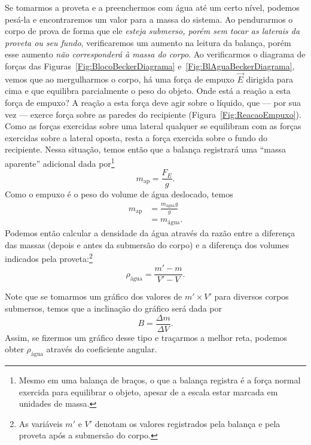 Se tomarmos a proveta e a preenchermos com água até um certo nível, podemos pesá-la e encontraremos um valor para a massa do sistema. Ao pendurarmos o corpo de prova de forma que ele \emph{esteja submerso, porém sem tocar as laterais da proveta ou seu fundo}, verificaremos um aumento na leitura da balança, porém esse aumento \emph{não corresponderá à massa do corpo}. Ao verificarmos o diagrama de forças das Figuras~\ref{Fig:BlocoBeckerDiagrama} e~\ref{Fig:BlAguaBeckerDiagrama}, vemos que ao mergulharmos o corpo, há uma força de empuxo $\vec{E}$ dirigida para cima e que equilibra parcialmente o peso do objeto. Onde está a reação a esta força de empuxo? A reação a esta força deve agir sobre o líquido, que --- por sua vez --- exerce força sobre as paredes do recipiente (Figura~\ref{Fig:ReacaoEmpuxo}). Como as forças exercidas sobre uma lateral qualquer se equilibram com as forças exercidas sobre a lateral oposta, resta a força exercida sobre o fundo do recipiente. Nessa situação, temos então que a balança registrará uma ``massa aparente'' adicional dada por\footnote{Mesmo em uma balança de braços, o que a balança registra é a força normal exercida para equilibrar o objeto, apesar de a escala estar marcada em unidades de massa.}
\begin{equation}
	m_{\textrm{ap}} = \frac{F_E}{g}.
\end{equation}
%
Como o empuxo é o peso do volume de água deslocado, temos
\begin{align}
	m_{\textrm{ap}} &= \frac{m_{\textrm{água}}g}{g} \\
	&=m_{\textrm{água}}.
\end{align}
%
Podemos então calcular a densidade da água através da razão entre a diferença das massas (depois e antes da submersão do corpo) e a diferença dos volumes indicados pela proveta:\footnote{As variáveis $m'$ e $V'$ denotam os valores registrados pela balança e pela proveta após a submersão do corpo.}
\begin{equation}
	\rho_{\textrm{água}} = \frac{m'-m}{V'-V}.
\end{equation}

Note que se tomarmos um gráfico dos valores de $m'\times V'$ para diversos corpos submersos, temos que a inclinação do gráfico será dada por
\begin{equation}
    B = \frac{\Delta m}{\Delta V}.
\end{equation}
%
Assim, se fizermos um gráfico desse tipo e traçarmos a melhor reta, podemos obter $\rho_{\text{água}}$ através do coeficiente angular. 


